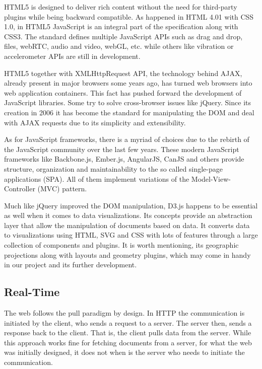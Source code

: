 HTML5 is designed to deliver rich content without the need for third-party plugins while being backward compatible. As happened in HTML 4.01 with CSS 1.0, in HTML5 JavaScript is an integral part of the specification along with CSS3. The standard defines multiple JavaScript APIs such as drag and drop, files, webRTC, audio and video, webGL, etc. while others like vibration or accelerometer APIs are still in development.

HTML5 together with XMLHttpRequest API, the technology behind AJAX, already present in major browsers some years ago, has turned web browsers into web application containers. This fact has pushed forward the development of JavaScript libraries. Some try to solve cross-browser issues like jQuery. Since its creation in 2006 it has become the standard for manipulating the DOM and deal with AJAX requests due to its simplicity and extensibility.

As for JavaScript frameworks, there is a myriad of choices due to the rebirth of the JavaScript community over the last few years. These modern JavaScript frameworks like Backbone.js, Ember.js, AngularJS, CanJS and others provide structure, organization and maintainability to the so called single-page applications (SPA). All of them implement variations of the Model-View-Controller (MVC) pattern.

Much like jQuery improved the DOM manipulation, D3.js happens to be essential as well when it comes to data visualizations. Its concepts provide an abstraction layer that allow the manipulation of documents based on data. It converts data to visualizations using HTML, SVG and CSS with lots of features through a large collection of components and plugins. It is worth mentioning, its geographic projections along with layouts and geometry plugins, which may come in handy in our project and its further development.

\subsection{Real-Time}

The web follows the pull paradigm by design. In HTTP the communication is initiated by the client, who sends a request to a server. The server then, sends a response back to the client. That is, the client pulls data from the server. While this approach works fine for fetching documents from a server, for what the web was initially designed, it does not when is the server who needs to initiate the communication.

